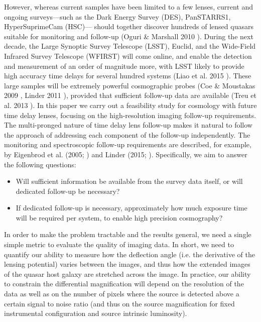 \documentclass[a4paper,11pt]{article}
\begin{document}
However, whereas current samples have been limited to a few lenses,
current and ongoing surveys---such as the Dark Energy Survey (DES),
PanSTARRS1, HyperSuprimeCam (HSC)--- should together discover hundreds
of lensed quasars suitable for monitoring and follow-up (Oguri \&
Marshall 2010 \cite{2010MNRAS.405.2579O}). During the next decade, the
Large Synoptic Survey Telescope (LSST), Euclid, and the Wide-Field
Infrared Survey Telescope (WFIRST) will come online, and enable the
detection and measurement of an order of magnitude more, with LSST
likely to provide high accuracy time delays for several hundred
systems (Liao et al. 2015 \cite{2015ApJ...800...11L}). These large
samples will be extremely powerful cosmographic probes (Coe \&
Moustakas 2009 \citep{2009ApJ...706...45C}, Linder 2011
\citep{2011PhRvD..84l3529L}), provided that sufficient follow-up data
are available (Treu et al. 2013 \citep{2013arXiv1306.1272T}). In this
paper we carry out a feasibility study for cosmology with future time
delay lenses, focusing on the high-resolution imaging follow-up
requirements. The multi-pronged nature of time delay lens follow-up
makes it natural to follow the approach of addressing each component
of the follow-up independently. The monitoring and spectroscopic
follow-up requirements are described, for example, by Eigenbrod et al.
(2005; \cite{2005A&A...436...25E}) and Linder (2015;
\cite{2015PhRvD..91h3511L}). Specifically, we aim to answer the
following questions:
%
\begin{itemize}
    \item Will sufficient information be available from the survey
            data itself, or will dedicated follow-up be necessary?
    \item If dedicated follow-up is necessary, approximately how much
            exposure time will be required per system, to enable
            high precision cosmography?
\end{itemize}
%
In order to make the problem tractable and the results general, we
need a single simple metric to evaluate the quality of imaging data.
In short, we need to quantify our ability to measure how the
deflection angle (i.e. the derivative of the lensing potential) varies
between the images, and thus how the extended images of the quasar
host galaxy are stretched across the image. In practice, our ability
to constrain the differential magnification will depend on the
resolution of the data as well as on the number of pixels where the
source is detected above a certain signal to noise ratio (and thus on
the source magnification for fixed instrumental configuration and
source intrinsic luminosity).
\end{document}
